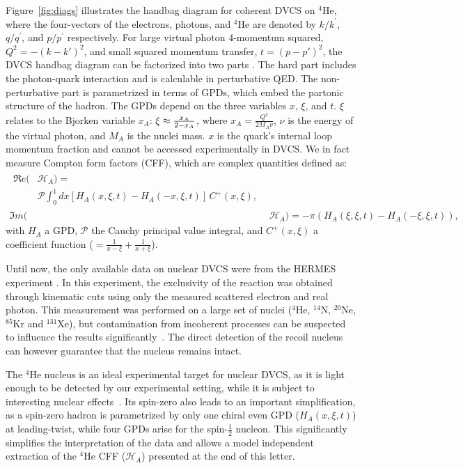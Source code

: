 \documentclass[twocolumn,nofootinbib,showpacs,prl,superscriptaddress,secnumarabic,amssymb,nobibnotes,aps,floatfix]{revtex4}
\begin{document}
Figure~\ref{fig:diags} illustrates the handbag diagram for coherent DVCS on 
$^4$He, where the four-vectors of the electrons, photons, and $^4$He are denoted 
by $k/k^\prime$, $q/q^\prime$, and $p/p^\prime$ respectively. For large 
virtual photon 4-momentum squared, $Q^2=-(k-k')^{2}$, and small squared 
momentum transfer, $t=(p-p')^{2}$, the DVCS handbag 
diagram can be factorized into two parts \cite{Freund_Collins,Ji_Osborne}. The 
hard part includes the photon-quark interaction and is calculable in 
perturbative QED. The non-perturbative part is parametrized in terms of GPDs, 
which embed the partonic structure of the hadron. The GPDs depend on the three 
variables $x$, $\xi$, and $t$. $\xi$ relates to the Bjorken variable 
$x_{A}$: $\xi\approx {{x_A}\over{2-x_A}}$, where $x_A=\frac{Q^2}{2M_A\nu}$, 
$\nu$ is the energy of the virtual photon, and 
$M_A$ is the nuclei mass. $x$ is the quark's internal loop momentum 
fraction and cannot be accessed experimentally in DVCS. We in fact measure 
Compton form factors (CFF), which are complex quantities defined as:
\begin{align}
\begin{split}
\Re e(&\mathcal{H}_{A}) = \\
    &\mathcal{P} 
\int_{0}^{1}dx[H_A(x,\xi,t)-H_A(-x,\xi,t)] \, C^{+}(x,\xi), 
\end{split} \\
\Im m(&\mathcal{H}_{A}) = - \pi ( H_A(\xi,\xi,t)-H_A(-\xi,\xi,t)),
\end{align}
with $H_A$ a GPD, $\mathcal{P}$ 
the Cauchy principal value integral, and $C^{+}(x,\xi)$ a coefficient function 
($=  \frac{1}{x-\xi} + \frac{1}{x+\xi}$).

Until now, the only available data on nuclear DVCS were from the HERMES 
experiment \cite{Airapetian:2010nu}. In this experiment, the exclusivity of 
the reaction was obtained through kinematic cuts using only the measured 
scattered electron and real photon. This measurement was performed on a large 
set of nuclei ($^4$He, $^{14}$N, $^{20}$Ne, $^{85}$Kr and $^{131}$Xe), 
but contamination from incoherent processes can be suspected to influence the results 
significantly~\cite{Guzey:2003jh}. The direct detection of the recoil nucleus 
can however guarantee that the nucleus remains intact. 

The $^4$He nucleus is an ideal experimental target for nuclear DVCS, as it is 
light enough to be detected by our experimental setting, while it is subject 
to interesting nuclear effects~\cite{JSeely}. Its spin-zero also leads to an 
important simplification, as a spin-zero hadron is parametrized by only one 
chiral even GPD ($H_{A}(x,\xi,t)$) at leading-twist, while four GPDs arise for 
the spin-$\frac{1}{2}$ nucleon. This significantly simplifies the interpretation of the 
data and allows a model independent extraction of the $^4$He CFF 
($\mathcal{H}_{A}$) presented at the end of this letter. 
\end{document}
